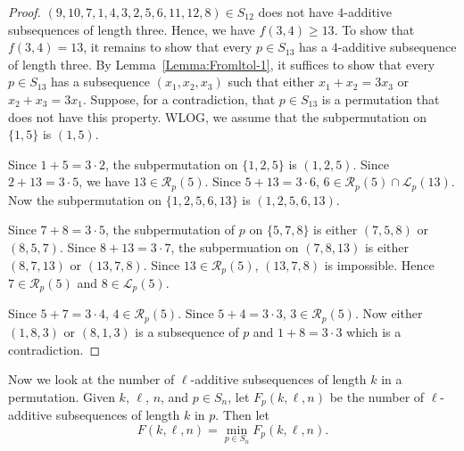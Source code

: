 \documentclass[11pt]{article}
\theoremstyle{definition}
\begin{document}
\begin{proof}
$(9,10,7,1,4,3,2,5,6,11,12,8)\in S_{12}$ does not have $4$-additive subsequences of length three. Hence, we have $f(3,4)\geq13$. To show that $f(3,4)=13$, it remains to show that every $p\in S_{13}$ has a $4$-additive subsequence of length three. By Lemma~\ref{Lemma:Fromltol-1}, it suffices to show that every $p\in S_{13}$ has a subsequence $(x_1,x_2,x_3)$ such that either $x_1+x_2=3x_3$ or $x_2+x_3=3x_1$. Suppose, for a contradiction, that $p\in S_{13}$ is a permutation that does not have this property. WLOG, we assume that the subpermutation on $\{1,5\}$ is $(1,5)$. 

    Since $1+5=3\cdot2$, the subpermutation on $\{1,2,5\}$ is $(1,2,5)$. Since $2+13=3\cdot5$, we have $13\in\mathcal{R}_p(5)$. Since $5+13=3\cdot6$, $6\in\mathcal{R}_p(5)\cap \mathcal{L}_p(13)$. Now the subpermutation on $\{1,2,5,6,13\}$ is $(1,2,5,6,13)$.

    Since $7+8=3\cdot5$, the subpermutation of $p$ on $\{5,7,8\}$ is either $(7,5,8)$ or $(8,5,7)$. Since $8+13=3\cdot7$, the subpermuation on $(7,8,13)$ is either $(8,7,13)$ or $(13,7,8)$. Since $13\in\mathcal{R}_p(5)$, $(13,7,8)$ is impossible. Hence $7\in\mathcal{R}_p(5)$ and $8\in\mathcal{L}_p(5)$.

    Since $5+7=3\cdot4$, $4\in\mathcal{R}_p(5)$. Since $5+4=3\cdot3$, $3\in\mathcal{R}_p(5)$. Now either $(1,8,3)$ or $(8,1,3)$ is a subsequence of $p$ and $1+8=3\cdot3$ which is a contradiction.
\end{proof}    
Now we look at the number of $\ell$-additive subsequences of length $k$ in a permutation. Given $k$, $\ell$, $n$, and $p\in S_n$, let $F_p(k,\ell,n)$ be the number of $\ell$-additive subsequences of length $k$ in $p$. Then let 
\[
F(k,\ell,n)=\min_{p\in S_n}F_p(k,\ell,n).
\]
\end{document}

